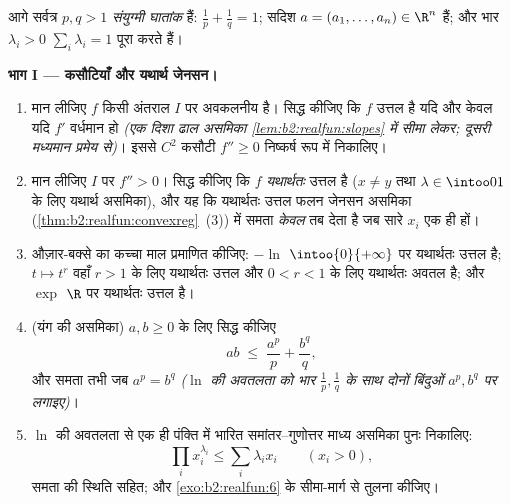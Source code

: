 \begin{problem}[{सप्ताहांत समस्या --- यंग, हॉल्डर, मिंकोव्स्की
और घात-माध्य शृंखला}]
\label{pb:b2:realfun:1}
आगे सर्वत्र $p, q > 1$ \emph{संयुग्मी घातांक} हैं: $\frac1p +
\frac1q = 1$; सदिश $a = (a_1, \dots, a_n) \in \R^n$ हैं; और भार
$\lambda_i > 0$ $\sum_i\lambda_i = 1$ पूरा करते हैं।

\medskip
\noindent\textbf{भाग I --- कसौटियाँ और यथार्थ जेनसन।}
\begin{enumerate}
  \item मान लीजिए $f$ किसी अंतराल $I$ पर अवकलनीय है। सिद्ध कीजिए कि $f$
        उत्तल है यदि और केवल यदि $f'$ वर्धमान हो \emph{(एक दिशा ढाल
        असमिका \cref{lem:b2:realfun:slopes} में सीमा लेकर; दूसरी मध्यमान प्रमेय से)}। इससे $C^2$
        कसौटी $f'' \geq 0$ निष्कर्ष रूप में निकालिए।
  \item मान लीजिए $I$ पर $f''> 0$। सिद्ध कीजिए कि $f$ \emph{यथार्थतः} उत्तल
        है ($x \neq y$ तथा $\lambda \in \intoo01$ के लिए यथार्थ असमिका), और यह कि यथार्थतः उत्तल
        फलन जेनसन असमिका (\cref{thm:b2:realfun:convexreg}~(3)) में समता \emph{केवल} तब देता है जब
        सारे $x_i$ एक ही हों।
  \item औज़ार-बक्से का कच्चा माल प्रमाणित कीजिए: $-\ln$ $\intoo{0}{+\infty}$ पर यथार्थतः
        उत्तल है; $t \mapsto t^r$ वहाँ $r > 1$ के लिए यथार्थतः उत्तल और $0 < r < 1$ के लिए
        यथार्थतः अवतल है; और $\exp$ $\R$ पर यथार्थतः उत्तल है।
  \item (यंग की असमिका) $a, b \geq 0$ के लिए सिद्ध कीजिए
        \[
        ab \;\leq\; \frac{a^p}{p} + \frac{b^q}{q},
        \]
        और समता तभी जब $a^p = b^q$ \emph{($\ln$ की अवतलता को भार $\frac1p, \frac1q$ के साथ
        दोनों बिंदुओं $a^p, b^q$ पर लगाइए)}।
  \item $\ln$ की अवतलता से एक ही पंक्ति में भारित समांतर--गुणोत्तर माध्य
        असमिका पुनः निकालिए:
        \[
        \prod_i x_i^{\lambda_i} \leq \sum_i\lambda_ix_i \qquad
        (x_i > 0),
        \]
        समता की स्थिति सहित; और \cref{exo:b2:realfun:6} के सीमा-मार्ग से तुलना कीजिए।
\end{enumerate}


\end{problem}
